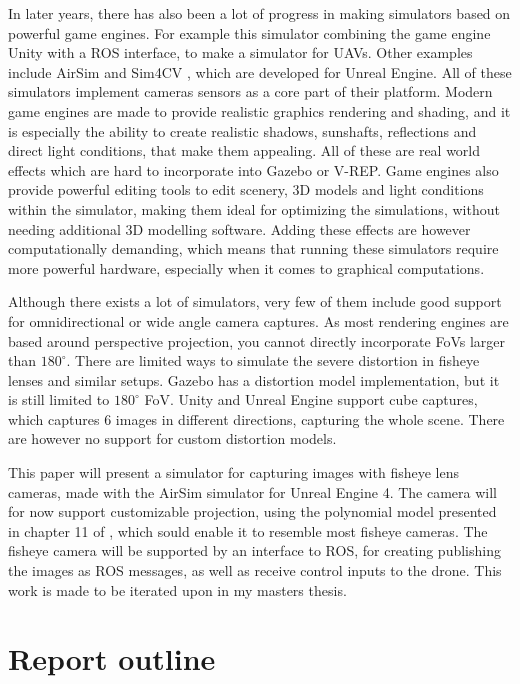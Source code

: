In later years, there has also been a lot of progress in making simulators based on powerful game engines. For example this simulator \cite{UnityROSsim} combining the game engine Unity with a ROS interface, to make a simulator for UAVs. Other examples include AirSim \cite{Airsim_paper} and Sim4CV \cite{Sim4CV_paper}, which are developed for Unreal Engine. All of these simulators implement cameras sensors as a core part of their platform. Modern game engines are made to provide realistic graphics rendering and shading, and it is especially the ability to create realistic shadows, sunshafts, reflections and direct light conditions, that make them appealing. All of these are real world effects which are hard to incorporate into Gazebo or V-REP. Game engines also provide powerful editing tools to edit scenery, 3D models and light conditions within the simulator, making them ideal for optimizing the simulations, without needing additional 3D modelling software. Adding these effects are however computationally demanding, which means that running these simulators require more powerful hardware, especially when it comes to graphical computations. 

Although there exists a lot of simulators, very few of them include good support for omnidirectional or wide angle camera captures. As most rendering engines are based around perspective projection, you cannot directly incorporate FoVs larger than $180^\circ$. There are limited ways to simulate the severe distortion in fisheye lenses and similar setups. Gazebo has a distortion model implementation, but it is still limited to $180^\circ$ FoV. Unity and Unreal Engine support cube captures, which captures 6 images in different directions, capturing the whole scene. There are however no support for custom distortion models. 

This paper will present a simulator for capturing images with fisheye lens cameras, made with the AirSim simulator for Unreal Engine 4. The camera will for now support customizable projection, using the polynomial model presented in chapter 11 of \cite{FisheyeCorke}, which sould enable it to resemble most fisheye cameras. The fisheye camera will be supported by an interface to ROS, for creating publishing the images as ROS messages, as well as receive control inputs to the drone. This work is made to be iterated upon in my masters thesis.

\section{Report outline}

